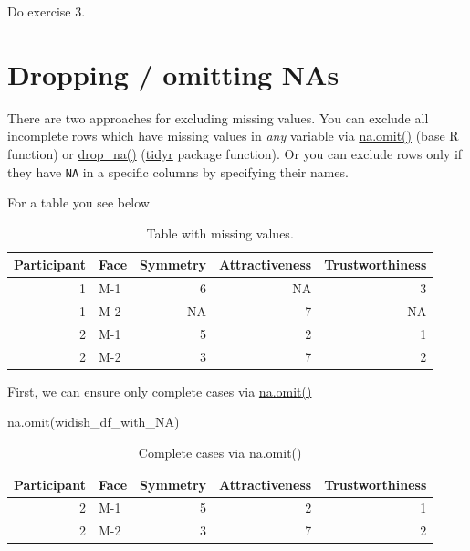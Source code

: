 \documentclass[
]{book}
\newenvironment{Shaded}{\begin{snugshade}}{\end{snugshade}}
\newcommand{\FunctionTok}[1]{\textcolor[rgb]{0.00,0.00,0.00}{#1}}
\newcommand{\NormalTok}[1]{#1}
\begin{document}
Do exercise 3.

\hypertarget{na.omit}{%
\section{Dropping / omitting NAs}\label{na.omit}}

There are two approaches for excluding missing values. You can exclude all incomplete rows which have missing values in \emph{any} variable via \href{https://stat.ethz.ch/R-manual/R-devel/library/stats/html/na.fail.html}{na.omit()} (base R function) or \href{https://tidyr.tidyverse.org/reference/drop_na.html}{drop\_na()} (\href{https://tidyr.tidyverse.org/}{tidyr} package function). Or you can exclude rows only if they have \texttt{NA} in a specific columns by specifying their names.

For a table you see below

\begin{table}

\caption{\label{tab:unnamed-chunk-281}Table with missing values.}
\centering
\begin{tabular}[t]{r|l|r|r|r}
\hline
Participant & Face & Symmetry & Attractiveness & Trustworthiness\\
\hline
1 & M-1 & 6 & NA & 3\\
\hline
1 & M-2 & NA & 7 & NA\\
\hline
2 & M-1 & 5 & 2 & 1\\
\hline
2 & M-2 & 3 & 7 & 2\\
\hline
\end{tabular}
\end{table}

First, we can ensure only complete cases via \href{https://stat.ethz.ch/R-manual/R-devel/library/stats/html/na.fail.html}{na.omit()}

\begin{Shaded}
\begin{Highlighting}[]
\FunctionTok{na.omit}\NormalTok{(widish\_df\_with\_NA)}
\end{Highlighting}
\end{Shaded}

\begin{table}

\caption{\label{tab:unnamed-chunk-282}Complete cases via na.omit()}
\centering
\begin{tabular}[t]{r|l|r|r|r}
\hline
Participant & Face & Symmetry & Attractiveness & Trustworthiness\\
\hline
2 & M-1 & 5 & 2 & 1\\
\hline
2 & M-2 & 3 & 7 & 2\\
\hline
\end{tabular}
\end{table}
\end{document}
